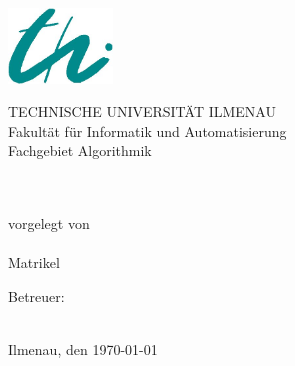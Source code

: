 \begin{titlepage}

\begin{center}
\includegraphics[height=2cm]{pics/logo-thi.jpg}
\vspace{1cm}

TECHNISCHE UNIVERSITÄT ILMENAU\\
Fakultät für Informatik und Automatisierung\\
Fachgebiet Algorithmik

\vspace{4cm}

{\large \sathema} \\ 
\vspace{1cm}
{\LARGE \normalfont \bfseries \layer} \\
\vspace{1cm}
{vorgelegt von} \\
\vspace{0.5cm}
{\large \saauthor}\\
{\large Matrikel \matrikel}
\vspace{2cm}

Betreuer: \\
\vspace{0.5cm}
\saprof \\

\vspace{1cm}

Ilmenau, den \today
\end{center}

\end{titlepage}
